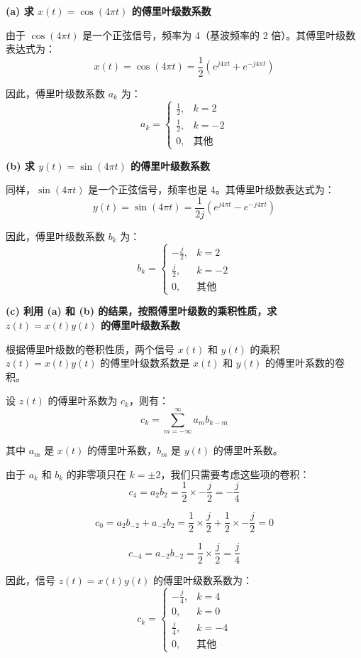 \documentclass[UTF8]{report}
\theoremstyle{MyLineTheoremStyle} %
\theoremstyle{MyBlockTheoremStyle} %
\theoremstyle{MySubsubsectionStyle} %
\begin{document}
\textbf{(a) 求 \( x(t) = \cos(4\pi t) \) 的傅里叶级数系数}

由于 \( \cos(4\pi t) \) 是一个正弦信号，频率为 4（基波频率的 2 倍）。其傅里叶级数表达式为：
\[
x(t) = \cos(4\pi t) = \frac{1}{2}\left(e^{j4\pi t} + e^{-j4\pi t}\right)
\]

因此，傅里叶级数系数 \( a_k \) 为：
\[
a_k =
\begin{cases}
\frac{1}{2}, & k = 2 \\
\frac{1}{2}, & k = -2 \\
0, & \text{其他}
\end{cases}
\]

\textbf{(b) 求 \( y(t) = \sin(4\pi t) \) 的傅里叶级数系数}

同样，\( \sin(4\pi t) \) 是一个正弦信号，频率也是 4。其傅里叶级数表达式为：
\[
y(t) = \sin(4\pi t) = \frac{1}{2j}\left(e^{j4\pi t} - e^{-j4\pi t}\right)
\]

因此，傅里叶级数系数 \( b_k \) 为：
\[
b_k =
\begin{cases}
-\frac{j}{2}, & k = 2 \\
\frac{j}{2}, & k = -2 \\
0, & \text{其他}
\end{cases}
\]

\textbf{(c) 利用 (a) 和 (b) 的结果，按照傅里叶级数的乘积性质，求 \( z(t) = x(t)y(t) \) 的傅里叶级数系数}

根据傅里叶级数的卷积性质，两个信号 \( x(t) \) 和 \( y(t) \) 的乘积 \( z(t) = x(t)y(t) \) 的傅里叶级数系数是 \( x(t) \) 和 \( y(t) \) 的傅里叶系数的卷积。

设 \( z(t) \) 的傅里叶系数为 \( c_k \)，则有：
\[
c_k = \sum_{m=-\infty}^{\infty} a_m b_{k-m}
\]

其中 \( a_m \) 是 \( x(t) \) 的傅里叶系数，\( b_m \) 是 \( y(t) \) 的傅里叶系数。

由于 \( a_k \) 和 \( b_k \) 的非零项只在 \( k = \pm 2 \)，我们只需要考虑这些项的卷积：
\[
c_4 = a_2 b_2 = \frac{1}{2} \times -\frac{j}{2} = -\frac{j}{4}
\]

\[
c_0 = a_2 b_{-2} + a_{-2} b_2 = \frac{1}{2} \times \frac{j}{2} + \frac{1}{2} \times -\frac{j}{2} = 0
\]

\[
c_{-4} = a_{-2} b_{-2} = \frac{1}{2} \times \frac{j}{2} = \frac{j}{4}
\]

因此，信号 \( z(t) = x(t) y(t) \) 的傅里叶级数系数为：
\[
c_k =
\begin{cases}
-\frac{j}{4}, & k = 4 \\
0, & k = 0 \\
\frac{j}{4}, & k = -4 \\
0, & \text{其他}
\end{cases}
\]
\end{document}
